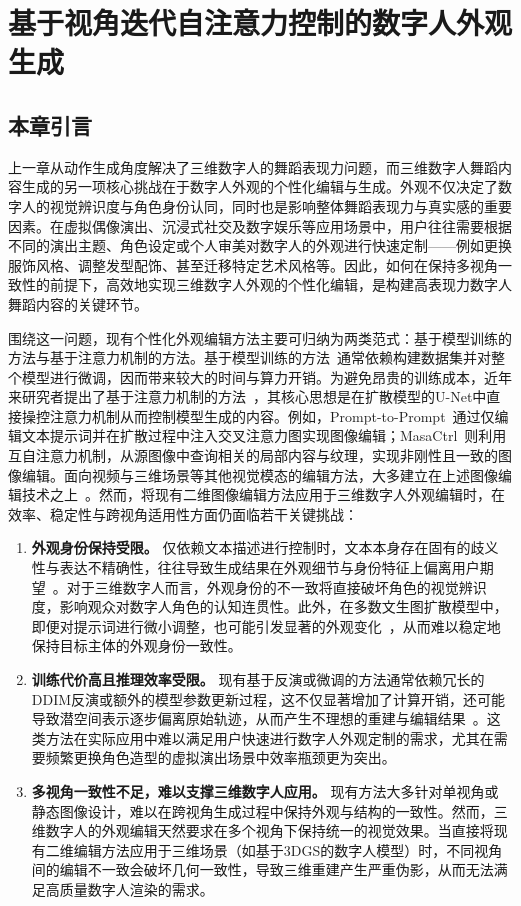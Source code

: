 \chapter{基于视角迭代自注意力控制的数字人外观生成}
\section{本章引言}
上一章从动作生成角度解决了三维数字人的舞蹈表现力问题，而三维数字人舞蹈内容生成的另一项核心挑战在于数字人外观的个性化编辑与生成。外观不仅决定了数字人的视觉辨识度与角色身份认同，同时也是影响整体舞蹈表现力与真实感的重要因素。在虚拟偶像演出、沉浸式社交及数字娱乐等应用场景中，用户往往需要根据不同的演出主题、角色设定或个人审美对数字人的外观进行快速定制——例如更换服饰风格、调整发型配饰、甚至迁移特定艺术风格等。因此，如何在保持多视角一致性的前提下，高效地实现三维数字人外观的个性化编辑，是构建高表现力数字人舞蹈内容的关键环节。

围绕这一问题，现有个性化外观编辑方法主要可归纳为两类范式：基于模型训练的方法与基于注意力机制的方法。基于模型训练的方法~\cite{brooks2022instructpix2pix,chen2023anydoor,yang2022paint}通常依赖构建数据集并对整个模型进行微调，因而带来较大的时间与算力开销。为避免昂贵的训练成本，近年来研究者提出了基于注意力机制的方法~\cite{hertz2022prompt,mokady2022null,cao2023masactrl,parmar2023zero}，其核心思想是在扩散模型的U-Net中直接操控注意力机制从而控制模型生成的内容。例如，Prompt-to-Prompt~\cite{hertz2022prompt}通过仅编辑文本提示词并在扩散过程中注入交叉注意力图实现图像编辑；MasaCtrl~\cite{cao2023masactrl}则利用互自注意力机制，从源图像中查询相关的局部内容与纹理，实现非刚性且一致的图像编辑。面向视频与三维场景等其他视觉模态的编辑方法，大多建立在上述图像编辑技术之上~\cite{instructnerf2023,ceylan2023pix2video}。然而，将现有二维图像编辑方法应用于三维数字人外观编辑时，在效率、稳定性与跨视角适用性方面仍面临若干关键挑战：
\begin{enumerate}
\item \textbf{外观身份保持受限。} 仅依赖文本描述进行控制时，文本本身存在固有的歧义性与表达不精确性，往往导致生成结果在外观细节与身份特征上偏离用户期望~\cite{cao2023masactrl}。对于三维数字人而言，外观身份的不一致将直接破坏角色的视觉辨识度，影响观众对数字人角色的认知连贯性。此外，在多数文生图扩散模型中，即便对提示词进行微小调整，也可能引发显著的外观变化~\cite{hertz2022prompt}，从而难以稳定地保持目标主体的外观身份一致性。

\item \textbf{训练代价高且推理效率受限。} 现有基于反演或微调的方法通常依赖冗长的DDIM反演或额外的模型参数更新过程，这不仅显著增加了计算开销，还可能导致潜空间表示逐步偏离原始轨迹，从而产生不理想的重建与编辑结果~\cite{mokady2022null}。这类方法在实际应用中难以满足用户快速进行数字人外观定制的需求，尤其在需要频繁更换角色造型的虚拟演出场景中效率瓶颈更为突出。

\item \textbf{多视角一致性不足，难以支撑三维数字人应用。} 现有方法大多针对单视角或静态图像设计，难以在跨视角生成过程中保持外观与结构的一致性。然而，三维数字人的外观编辑天然要求在多个视角下保持统一的视觉效果。当直接将现有二维编辑方法应用于三维场景（如基于3DGS的数字人模型）时，不同视角间的编辑不一致会破坏几何一致性，导致三维重建产生严重伪影，从而无法满足高质量数字人渲染的需求。
\end{enumerate}

